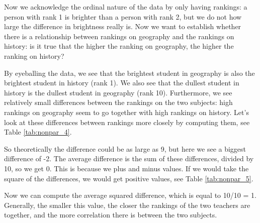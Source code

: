 \begin{kframe}


{\ttfamily\noindent\bfseries{}}\end{kframe}

Now we acknowledge the ordinal nature of the data by only having rankings: a person with rank 1 is brighter than a person with rank 2, but we do not how large the difference in brightness really is. Now we want to establish whether there is a relationship between rankings on geography and the rankings on history: is it true that the higher the ranking on geography, the higher the ranking on history?

By eyeballing the data, we see that the brightest student in geography is also the brightest student in history (rank 1). We also see that the dullest student in history is the dullest student in geography (rank 10). Furthermore, we see relatively small differences between the rankings on the two subjects: high rankings on geography seem to go together with high rankings on history. Let's look at these differences between rankings more closely by computing them, see Table \ref{tab:nonpar_4}.

\begin{kframe}


{\ttfamily\noindent\bfseries{}}\end{kframe}

So theoretically the difference could be as large as 9, but here we see a biggest difference of -2. The average difference is the sum of these differences, divided by 10, so we get 0. This is because we plus and minus values. If we would take the square of the differences, we would get positive values, see Table \ref{tab:nonpar_5}.

\begin{kframe}


{\ttfamily\noindent\bfseries{}}\end{kframe}

Now we can compute the average squared difference, which is equal to 10/10 = 1. Generally, the smaller this value, the closer the rankings of the two teachers are together, and the more correlation there is between the two subjects. 

